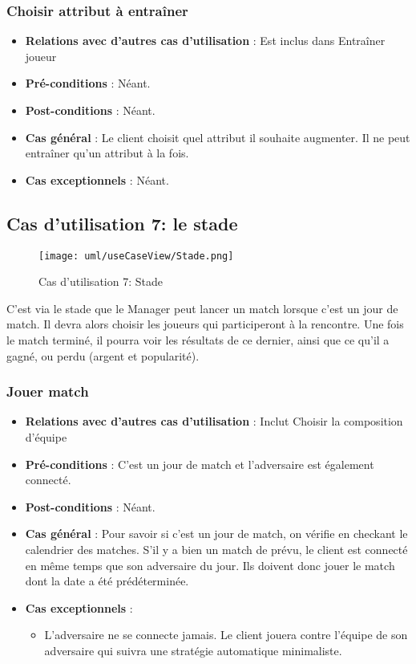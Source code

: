 \documentclass[a4paper,titlepage]{scrreprt}
\begin{document}
    \subsubsection{Choisir attribut à entraîner}
      \begin{itemize}
        \item \textbf{Relations avec d'autres cas d'utilisation}  : Est inclus dans Entraîner joueur
        \item \textbf{Pré-conditions} : Néant.
        \item \textbf{Post-conditions} : Néant.
        \item \textbf{Cas général} : Le client choisit quel attribut il souhaite augmenter. Il ne peut entraîner qu’un attribut à la fois. 
        \item \textbf{Cas exceptionnels} : Néant.
      \end{itemize}

  \subsection{Cas d'utilisation 7: le stade}
  \begin{figure}[H]
    \center
    \texttt{[image: uml/useCaseView/Stade.png]}
    \caption{Cas d'utilisation 7: Stade}
  \end{figure}
  C'est via le \gls{stade}  que le Manager peut lancer un match lorsque c'est un jour de match. Il devra alors choisir les joueurs qui participeront à la rencontre. Une fois le match terminé, il pourra voir les résultats de ce dernier, ainsi que ce qu'il a gagné, ou perdu (argent et popularité).
    \subsubsection{Jouer match}
      \begin{itemize}
        \item \textbf{Relations avec d'autres cas d'utilisation}  : Inclut Choisir la composition d’équipe
        \item \textbf{Pré-conditions} : C’est un jour de match et l’adversaire est également connecté.
        \item \textbf{Post-conditions} : Néant.
        \item \textbf{Cas général} : Pour savoir si c'est un jour de match, on vérifie en checkant le \gls{calendrier}  des matches. S'il y a bien un match de prévu, le client est connecté en même temps que son adversaire du jour. Ils doivent donc jouer le match dont la date a été prédéterminée.
        \item \textbf{Cas exceptionnels} : 
          \begin{itemize}
            \item L’adversaire ne se connecte jamais. Le client jouera contre l’équipe de son adversaire qui suivra une stratégie automatique minimaliste.
          \end{itemize}
      \end{itemize}
\end{document}
